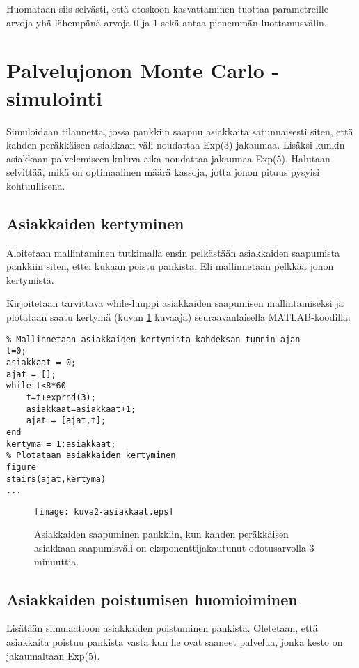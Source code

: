 \documentclass[a4paper,11pt]{article}
\begin{document}
{Huomataan siis selvästi, että otoskoon kasvattaminen tuottaa parametreille arvoja yhä lähempänä arvoja $0$ ja $1$ sekä antaa pienemmän luottamusvälin.

\section{Palvelujonon Monte Carlo -simulointi}

Simuloidaan tilannetta, jossa pankkiin saapuu asiakkaita satunnaisesti siten, että kahden peräkkäisen asiakkaan väli noudattaa Exp($3$)-jakaumaa. Lisäksi kunkin asiakkaan palvelemiseen kuluva aika noudattaa jakaumaa Exp($5$). Halutaan selvittää, mikä on optimaalinen määrä kassoja, jotta jonon pituus pysyisi kohtuullisena.

\subsection{Asiakkaiden kertyminen}

Aloitetaan mallintaminen tutkimalla ensin pelkästään asiakkaiden saapumista pankkiin siten, ettei kukaan poistu pankista. Eli mallinnetaan pelkkää jonon kertymistä.

Kirjoitetaan tarvittava while-luuppi asiakkaiden saapumisen mallintamiseksi ja plotataan saatu kertymä (kuvan \ref{fig:asiakkaat} kuvaaja) seuraavanlaisella MATLAB-koodilla:

\begin{lstlisting}
% Mallinnetaan asiakkaiden kertymista kahdeksan tunnin ajan
t=0;
asiakkaat = 0;
ajat = [];
while t<8*60
    t=t+exprnd(3);
    asiakkaat=asiakkaat+1;
    ajat = [ajat,t];
end
kertyma = 1:asiakkaat;
% Plotataan asiakkaiden kertyminen
figure
stairs(ajat,kertyma)
...
\end{lstlisting}

\begin{figure}
    \centering
    \texttt{[image: kuva2-asiakkaat.eps]}
    \caption{Asiakkaiden saapuminen pankkiin, kun kahden peräkkäisen asiakkaan saapumisväli on eksponenttijakautunut odotusarvolla $3$ minuuttia.}
    \label{fig:asiakkaat}
\end{figure}

\subsection{Asiakkaiden poistumisen huomioiminen}

Lisätään simulaatioon asiakkaiden poistuminen pankista. Oletetaan, että asiakkaita poistuu pankista vasta kun he ovat saaneet palvelua, jonka kesto on jakaumaltaan Exp($5$).

}
\end{document}
